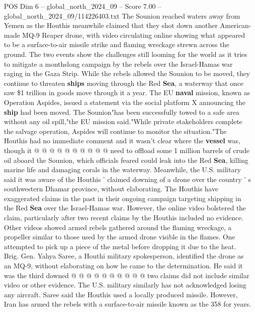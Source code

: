 \begin{textsample}{POS Dim 6 – global\_north\_2024\_09 – Score 7.00 – global\_north\_2024\_09/114226403.txt}  \label{ex:f6_pos_363}
The Sounion reached waters away from Yemen as the Houthis meanwhile claimed that they shot down another American-made MQ-9 Reaper drone, with video circulating online showing what appeared to be a surface-to-air missile strike and flaming wreckage strewn across the ground.
The two events show the challenges still looming for the world as it tries to mitigate a monthslong campaign by the rebels over the Israel-Hamas war raging in the Gaza Strip.
While the rebels allowed the Sounion to be moved, they continue to threaten \textbf{ships} moving through the Red \textbf{Sea}, a waterway that once saw \$1 trillion in goods move through it a year.
The EU \textbf{naval} mission, known as Operation Aspides, issued a statement via the social platform X announcing the \textbf{ship} had been moved.
The Sounion"has been successfully towed to a safe area without any oil spill,"the EU mission said."While private stakeholders complete the salvage operation, Aspides will continue to monitor the situation."The Houthis had no immediate comment and it wasn't clear where the \textbf{vessel} was, though it @ @ @ @ @ @ @ @ @ @ need to offload some 1 million barrels of crude oil aboard the Sounion, which officials feared could leak into the Red \textbf{Sea}, killing marine life and damaging corals in the waterway.
Meanwhile, the U.S. military said it was aware of the Houthis ' claimed downing of a drone over the country ' s southwestern Dhamar province, without elaborating.
The Houthis have exaggerated claims in the past in their ongoing campaign targeting shipping in the Red \textbf{Sea} over the Israel-Hamas war.
However, the online video bolstered the claim, particularly after two recent claims by the Houthis included no evidence.
Other videos showed armed rebels gathered around the flaming wreckage, a propeller similar to those used by the armed drone visible in the flames.
One attempted to pick up a piece of the metal before dropping it due to the heat.
Brig.
Gen.
Yahya Saree, a Houthi military spokesperson, identified the drone as an MQ-9, without elaborating on how he came to the determination.
He said it was the third downed @ @ @ @ @ @ @ @ @ @ two claims did not include similar video or other evidence.
The U.S. military similarly has not acknowledged losing any aircraft.
Saree said the Houthis used a locally produced missile.
However, Iran has armed the rebels with a surface-to-air missile known as the 358 for years.

\end{textsample}
